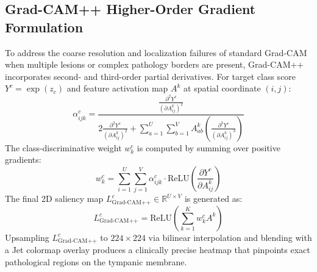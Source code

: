 \documentclass[12pt,a4paper]{report}
\begin{document}
\subsection{Grad-CAM++ Higher-Order Gradient Formulation}
To address the coarse resolution and localization failures of standard Grad-CAM when multiple lesions or complex pathology borders are present, Grad-CAM++ incorporates second- and third-order partial derivatives. For target class score $Y^c = \exp(z_c)$ and feature activation map $A^k$ at spatial coordinate $(i, j)$:
\begin{equation}
    \alpha_{ijk}^c = \frac{\frac{\partial^2 Y^c}{(\partial A_{ij}^k)^2}}{2\frac{\partial^2 Y^c}{(\partial A_{ij}^k)^2} + \sum_{a=1}^U \sum_{b=1}^V A_{ab}^k \left( \frac{\partial^3 Y^c}{(\partial A_{ij}^k)^3} \right)}
\end{equation}
The class-discriminative weight $w_k^c$ is computed by summing over positive gradients:
\begin{equation}
    w_k^c = \sum_{i=1}^U \sum_{j=1}^V \alpha_{ijk}^c \cdot \mathrm{ReLU}\left( \frac{\partial Y^c}{\partial A_{ij}^k} \right)
\end{equation}
The final 2D saliency map $L_{\text{Grad-CAM++}}^c \in \mathbb{R}^{U \times V}$ is generated as:
\begin{equation}
    L_{\text{Grad-CAM++}}^c = \mathrm{ReLU}\left( \sum_{k=1}^K w_k^c A^k \right)
\end{equation}
Upsampling $L_{\text{Grad-CAM++}}^c$ to $224 \times 224$ via bilinear interpolation and blending with a Jet colormap overlay produces a clinically precise heatmap that pinpoints exact pathological regions on the tympanic membrane.
\end{document}
